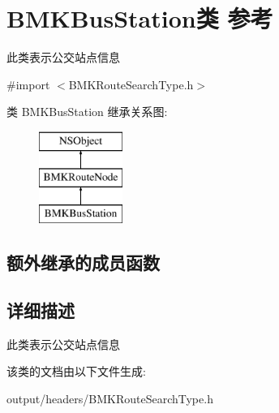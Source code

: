 \hypertarget{interface_b_m_k_bus_station}{}\section{B\+M\+K\+Bus\+Station类 参考}
\label{interface_b_m_k_bus_station}


此类表示公交站点信息  




{\ttfamily \#import $<$B\+M\+K\+Route\+Search\+Type.\+h$>$}

类 B\+M\+K\+Bus\+Station 继承关系图\+:\begin{figure}[H]
\begin{center}
\leavevmode
\includegraphics[height=3.000000cm]{interface_b_m_k_bus_station}
\end{center}
\end{figure}
\subsection*{额外继承的成员函数}


\subsection{详细描述}
此类表示公交站点信息 

该类的文档由以下文件生成\+:\begin{DoxyCompactItemize}
\item 
output/headers/B\+M\+K\+Route\+Search\+Type.\+h\end{DoxyCompactItemize}
